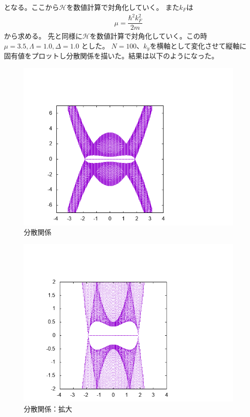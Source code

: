 \documentclass{jarticle}
\begin{document}
となる。ここから$\mathcal{H}$を数値計算で対角化していく。
また$k_{F}$は
\begin{align}
\mu=\dfrac{\hbar^{2}k_F^{2}}{2m}
\end{align}
から求める。
先と同様に$\mathcal{H}$を数値計算で対角化していく。この時$\mu=3.5, \Lambda=1.0, \Delta=1.0$	とした。
$N=100$、$k_y$を横軸として変化させて縦軸に固有値をプロットし分散関係を描いた。結果は以下のようになった。\\
\begin{figure}[H]
	\centering
	\includegraphics[scale=0.5]{../../18/KS/18-1/graph/data.png}
	\caption{分散関係}
\end{figure}
\begin{figure}[H]
	\centering
	\includegraphics[scale=0.5]{../../18/KS/18-2/graph/data.png}
	\caption{分散関係：拡大}
\end{figure}
\end{document}
